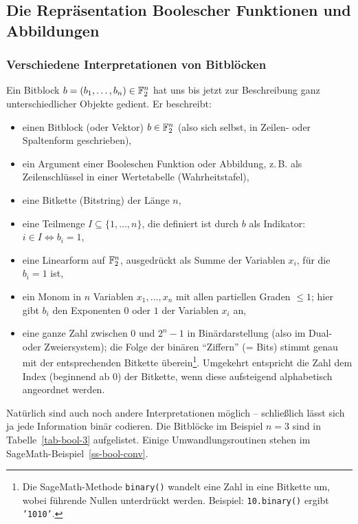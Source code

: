 \begin{refsegment}
\subsection{Die Repräsentation Boolescher Funktionen und Abbildungen}\label{ss-bool-repr}

\subsubsection*{Verschiedene Interpretationen von Bitblöcken}

Ein Bitblock $b = (b_1, \ldots, b_n) \in \mathbb{F}_2^n$ hat uns bis jetzt zur
Beschreibung ganz unterschiedlicher Objekte gedient. Er beschreibt:
\begin{itemize}
   \item einen Bitblock (oder Vektor) $b \in \mathbb{F}_2^n$ (also sich selbst,
      in Zeilen- oder Spaltenform geschrieben),
   \item ein Argument einer Booleschen Funktion oder Abbildung, z.\,B. als
      Zeilenschlüssel in einer Wertetabelle (Wahrheitstafel),
   \item eine Bitkette (Bitstring) der Länge $n$,
   \item eine Teilmenge $I \subseteq \{1, \ldots, n\}$, die definiert ist
      durch $b$ als Indikator: $i \in I \Leftrightarrow b_i = 1$,
   \item eine Linearform auf $\mathbb{F}_2^n$, ausgedrückt als
      Summe der Variablen $x_i$, für die $b_i = 1$ ist,
   \item ein Monom in $n$ Variablen $x_1, \ldots, x_n$ mit allen partiellen
      Graden $\leq 1$; hier gibt $b_i$ den Exponenten $0$ oder $1$ der Variablen
      $x_i$ an,
   \item eine ganze Zahl zwischen $0$ und $2^n - 1$ in Binärdarstellung (also
      im Dual- oder Zweiersystem); die Folge der binären "`Ziffern"' (= Bits)
      stimmt genau mit der entsprechenden Bitkette überein\footnote{%
      Die SageMath-Methode {\tt binary()} wandelt eine Zahl in eine Bitkette um,
      wobei führende Nullen unterdrückt werden. Beispiel: {\tt 10.binary()}
      ergibt {\tt '1010'}.
      }. Umgekehrt entspricht
      die Zahl dem Index (beginnend ab 0) der Bitkette, wenn diese aufsteigend
      alphabetisch angeordnet werden.
\end{itemize}
Natürlich sind auch noch andere Interpretationen möglich -- schließlich lässt
sich ja jede Information binär codieren. Die Bitblöcke im Beispiel $n = 3$
sind in Tabelle~\ref{tab-bool-3} aufgelistet. Einige Umwandlungsroutinen
stehen im SageMath-Beispiel~\ref{ss-bool-conv}.


\end{refsegment}
